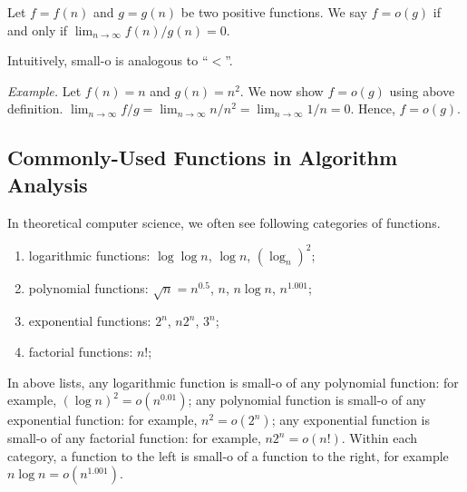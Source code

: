\begin{definition}[small-o]
Let $f = f(n)$ and $g = g(n)$ be two positive functions. We say $f = o(g)$ if and only if $\lim_{n\to\infty} f(n) / g(n) = 0$.
\end{definition}

Intuitively, small-o is analogous to ``$<$''.

\emph{Example.} Let $f(n) = n$ and $g(n) = n^2$. We now show $f = o(g)$ using above definition.
$\lim_{n\to\infty} f / g = \lim_{n\to\infty} n/n^2 = \lim_{n\to\infty} 1 / n = 0$.
Hence, $f = o(g)$.


\subsection*{Commonly-Used Functions in Algorithm Analysis}

In theoretical computer science, we often see following categories of functions.
\vspace*{-\topsep}
\begin{enumerate}
\item logarithmic functions: $\log\log n$, $\log n$, $(\log_n)^2$;
\item polynomial functions: $\sqrt{n} = n^{0.5}$, $n$, $n\log n$, $n^{1.001}$;
\item exponential functions: $2^n$, $n2^n$, $3^n$;
\item factorial functions: $n!$;
\end{enumerate}

In above lists, any logarithmic function is small-o of any polynomial function: for example, $(\log n)^2 = o(n^{0.01})$;
any polynomial function is small-o of any exponential function: for example, $n^2 = o(2^n)$;
any exponential function is small-o of any factorial function: for example, $n2^n = o(n!)$.
Within each category, a function to the left is small-o of a function to the right, for example $n\log n = o(n^{1.001})$.
